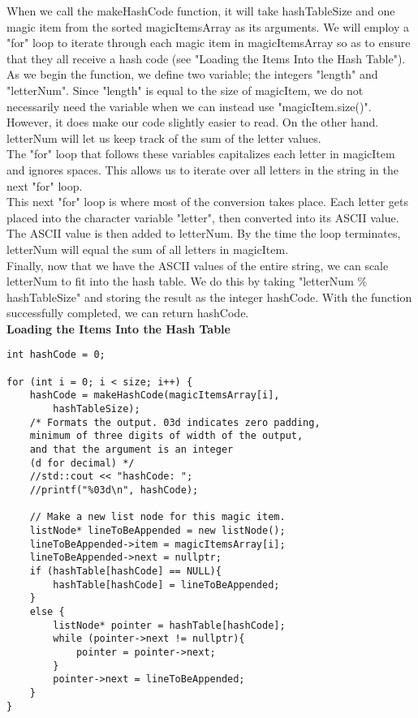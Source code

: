 \documentclass{article}
\begin{document}
When we call the makeHashCode function, it will take hashTableSize and one magic item from the sorted magicItemsArray as its arguments. We will employ a "for" loop to iterate through each magic item in magicItemsArray so as to ensure that they all receive a hash code (see "Loading the Items Into the Hash Table"). \\
As we begin the function, we define two variable; the integers "length" and "letterNum". Since "length" is equal to the size of magicItem, we do not necessarily need the variable when we can instead use "magicItem.size()". However, it does make our code slightly easier to read. On the other hand. letterNum will let us keep track of the sum of the letter values. \\
The "for" loop that follows these variables capitalizes each letter in magicItem and ignores spaces. This allows us to iterate over all letters in the string in the next "for" loop. \\
This next "for" loop is where most of the conversion takes place. Each letter gets placed into the character variable "letter", then converted into its ASCII value. The ASCII value is then added to letterNum. By the time the loop terminates, letterNum will equal the sum of all letters in magicItem. \\
Finally, now that we have the ASCII values of the entire string, we can scale letterNum to fit into the hash table. We do this by taking "letterNum \% hashTableSize" and storing the result as the integer hashCode. With the function successfully completed, we can return hashCode.\\


\textbf{Loading the Items Into the Hash Table}
\begin{lstlisting}
int hashCode = 0;

for (int i = 0; i < size; i++) {
    hashCode = makeHashCode(magicItemsArray[i], 
        hashTableSize);
    /* Formats the output. 03d indicates zero padding, 
    minimum of three digits of width of the output,
    and that the argument is an integer 
    (d for decimal) */
    //std::cout << "hashCode: ";
    //printf("%03d\n", hashCode);
    
    // Make a new list node for this magic item.
    listNode* lineToBeAppended = new listNode();
    lineToBeAppended->item = magicItemsArray[i];
    lineToBeAppended->next = nullptr;
    if (hashTable[hashCode] == NULL){
        hashTable[hashCode] = lineToBeAppended;
    }
    else {
        listNode* pointer = hashTable[hashCode];
        while (pointer->next != nullptr){
            pointer = pointer->next;
        }
        pointer->next = lineToBeAppended;
    }
}
\end{lstlisting}
\end{document}
